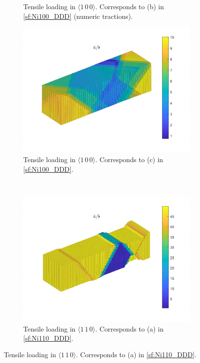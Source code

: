 \begin{figure}
\begin{subfigure}[t]{0.45\linewidth}
        \caption{Tensile loading in $\langle 1\, 0\, 0 \rangle$. Corresponds to (b) in \cref{sf:Ni100_DDD} (numeric tractions).}
        \label{sf:Ni100aN_disp}
    \end{subfigure}

    \begin{subfigure}[t]{0.45\linewidth}
        \centering
        \includegraphics[width=\linewidth]{../data/16-Mar-2021_8_tensile_ni_100_214400_disp.pdf}
        \caption{Tensile loading in $\langle 1\, 0\, 0 \rangle$. Corresponds to (c) in \cref{sf:Ni100_DDD}.}
        \label{sf:Ni100b_disp}
    \end{subfigure}
    ~
    \begin{subfigure}[t]{0.45\linewidth}
        \centering
        \includegraphics[width=\linewidth]{../data/11-Mar-2021_4_tensile_ni_110_205600_disp.pdf}
        \caption{Tensile loading in $\langle 1\, 1\, 0 \rangle$. Corresponds to (a) in \cref{sf:Ni110_DDD}.}
        \label{sf:Ni110a_disp}
    \end{subfigure}


\end{figure}
